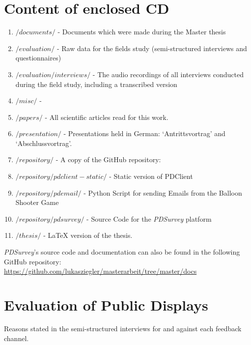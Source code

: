 \section{Content of enclosed CD}
\label{appendix:cd-contents}


    \begin{enumerate}
    \item $/documents/$ - Documents which were made during the Master thesis
    \item $/evaluation/$ - Raw data for the fields study (semi-structured interviews and questionnaires)
    \item $/evaluation/interviews/$ - The audio recordings of all interviews conducted during the field study, including a transcribed version
    
    \item $/misc/$ - 
    \item $/papers/$ - All scientific articles read for this work.
    \item $/presentation/$ - Presentations held in German: `Antrittsvortrag' and `Abschlussvortrag'.

    \item $/repository/$ - A copy of the GitHub repository:
    \item $/repository/pdclient-static/$ - Static version of PDClient
    \item $/repository/pdemail/$ - Python Script for sending Emails from the Balloon Shooter Game
    \item $/repository/pdsurvey/$ - Source Code for the \textit{PDSurvey} platform

    \item $/thesis/$ - LaTeX version of the thesis.

    \end{enumerate}

  \textit{PDSurvey}'s source code and documentation can also be found in the following GitHub repository: \url{https://github.com/lukasziegler/masterarbeit/tree/master/docs}



\cleardoublepage
\section{Evaluation of Public Displays}
\label{appendix:evaluation-of-PDs}

  Reasons stated in the semi-structured interviews for and against each feedback channel.


